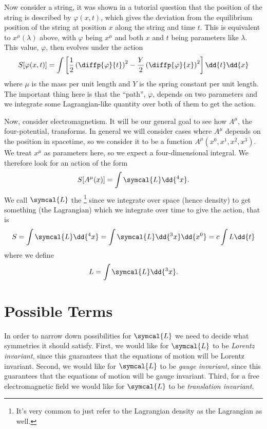 \documentclass[fleqn]{NotesClass}
\newcommand*{\lagrangian}{L}
\newcommand*{\lagrangianDensity}{\symcal{L}}
\begin{document}
    Now consider a string, it was shown in a tutorial question that the position of the string is described by \(\varphi(x, t)\), which gives the deviation from the equilibrium position of the string at position \(x\) along the string and time \(t\).
    This is equivalent to \(x^\mu(\lambda)\) above, with \(\varphi\) being \(x^\mu\) and both \(x\) and \(t\) being parameters like \(\lambda\).
    This value, \(\varphi\), then evolves under the action
    \begin{equation}
        S[\varphi(x, t)] = \int \left[ \frac{1}{2}\left( \diffp{\varphi}{t} \right)^2 - \frac{Y}{2}\left( \diffp{\varphi}{x} \right)^2 \right] \dd{t} \dd{x}
    \end{equation}
    where \(\mu\) is the mass per unit length and \(Y\) is the spring constant per unit length.
    The important thing here is that the \enquote{path}, \(\varphi\), depends on two parameters and we integrate some Lagrangian-like quantity over both of them to get the action.
    
    Now, consider electromagnetism.
    It will be our general goal to see how \(A^\mu\), the four-potential, transforms.
    In general we will consider cases where \(A^\mu\) depends on the position in spacetime, so we consider it to be a function \(A^\mu(x^0, x^1, x^2, x^3)\).
    We treat \(x^\mu\) as parameters here, so we expect a four-dimensional integral.
    We therefore look for an action of the form
    \begin{equation}
        S[A^\mu(x)] = \int \lagrangianDensity \dd{^4x}.
    \end{equation}
    We call \(\lagrangianDensity\) the \footnote{It's very common to just refer to the Lagrangian density as the Lagrangian as well.} since we integrate over space (hence density) to get something (the Lagrangian) which we integrate over time to give the action, that is
    \begin{equation}
        S = \int \lagrangianDensity \dd{^4x} = \int \lagrangianDensity \dd{^3 x} \dd{x^0} = c \int \lagrangian \dd{t}
    \end{equation}
    where we define
    \begin{equation}
        \lagrangian = \int \lagrangianDensity \dd{^3x}.
    \end{equation}
    
    \section{Possible Terms}
    In order to narrow down possibilities for \(\lagrangianDensity\) we need to decide what symmetries it should satisfy.
    First, we would like for \(\lagrangianDensity\) to be \emph{Lorentz invariant}, since this guarantees that the equations of motion will be Lorentz invariant.
    Second, we would like for \(\lagrangianDensity\) to be \emph{gauge invariant}, since this guarantees that the equations of motion will be gauge invariant.
    Third, for a free electromagnetic field we would like for \(\lagrangianDensity\) to be \emph{translation invariant}.
    
\end{document}
